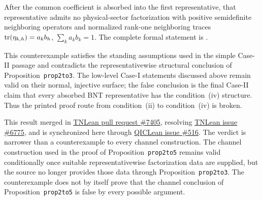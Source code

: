 \documentclass{article}
\begin{document}
After the common coefficient is absorbed into the first representative, that
representative admits no physical-sector factorization with positive
semidefinite neighboring operators and normalized rank-one neighboring traces
$\operatorname{tr}(\eta_{k,h})=a_kb_h$, $\sum_k a_kb_k=1$. The complete formal statement is
.

This counterexample satisfies the standing assumptions used in the simple
Case-II passage and contradicts the representativewise structural conclusion
of Proposition~\texttt{prop2to3}. The low-level Case-I statements discussed
above remain valid on their normal, injective surface; the false conclusion is
the final Case-II claim that every absorbed BNT representative has the
condition~(iv) structure. Thus the printed proof route from condition~(ii) to
condition~(iv) is broken.

This result merged in
\href{https://github.com/LionSR/TNLean/pull/7405}{TNLean pull request \#7405},
resolving
\href{https://github.com/LionSR/TNLean/issues/6775}{TNLean issue \#6775}, and
is synchronized here through
\href{https://github.com/LionSR/QICLean/issues/516}{QICLean issue \#516}.
The verdict is narrower than a counterexample to every channel construction.
The channel construction used in the proof of
Proposition~\texttt{prop2to5} remains valid conditionally once suitable
representativewise factorization data are supplied, but the source no longer
provides those data through Proposition~\texttt{prop2to3}. The counterexample
does not by itself prove that the channel conclusion of
Proposition~\texttt{prop2to5} is false by every possible argument.



\end{document}
